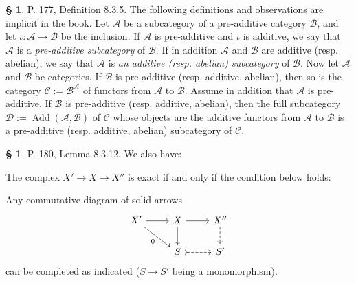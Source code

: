 \documentclass[12pt]{article}
\theoremstyle{remark}
\theoremstyle{definition}
\newtheorem{s}[thm]{\S}
\newcommand{\cc}{\mathcal}
\DeclareMathOperator{\Ad}{Add}
\begin{document}
%
%
\begin{s} 
P. 177, Definition 8.3.5. The following definitions and observations are implicit in the book. Let $\cc A$ be a subcategory of a pre-additive category $\cc B$, and let $\iota:\cc A\to \cc B$ be the inclusion. If $\cc A$ is pre-additive and $\iota$ is additive, we say that $\cc A$ is a {\em pre-additive subcategory} of $\cc B$. If in addition $\cc A$ and $\cc B$ are additive (resp. abelian), we say that $\cc A$ is {\em an additive (resp. abelian) subcategory} of $\cc B$. Now let $\cc A$ and $\cc B$ be categories. If $\cc B$ is pre-additive (resp. additive, abelian), then so is the category $\cc C:=\cc B^\cc A$ of functors from $\cc A$ to $\cc B$. Assume in addition that $\cc A$ is pre-additive. If $\cc B$ is pre-additive (resp. additive, abelian), then the full subcategory $\cc D:=\Ad(\cc A,\cc B)$ of $\cc C$ whose objects are the additive functors from $\cc A$ to $\cc B$ is a pre-additive (resp. additive, abelian) subcategory of $\cc C$.
\end{s}
%
%
\begin{s}\label{8312}
P. 180, Lemma 8.3.12. We also have:

The complex $X'\to X\to X''$ is exact if and only if the condition below holds:

Any commutative diagram of solid arrows
$$
\begin{tikzcd}
X'\ar{dr}[swap]{0}\ar{r}&X\ar{d}\ar{r}&X''\ar[dashed]{d}\\ 
{}&S\ar[tail,dashed]{r}&S'
\end{tikzcd}
$$ 
can be completed as indicated ($S\to S'$ being a monomorphism).
\end{s}
%
%
\end{document}
